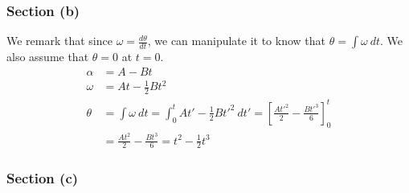\documentclass[12pt]{article}
\begin{document}
\subsubsection*{Section (b)}
We remark that since $\omega = \frac{d\theta}{dt}$, we can manipulate it to know that $\theta = \int \omega\ dt$. We also assume that $\theta = 0$ at $t = 0$.
\begin{align*}
    \alpha  &=  A - Bt\\
    \omega  &=  At - \frac{1}{2}Bt^2\\
    \theta  &=  \int \omega\ dt
            =   \int_{0}^{t} At' - \frac{1}{2}Bt'^2\ dt'
            =   \left[\frac{At'^2}{2} - \frac{Bt'^3}{6}\right]_0^t\\
            &=  \frac{At^2}{2} - \frac{Bt^3}{6}
            =   \boxed{t^2 - \frac{1}{2}t^3}
\end{align*}

\subsubsection*{Section (c)}
\end{document}
